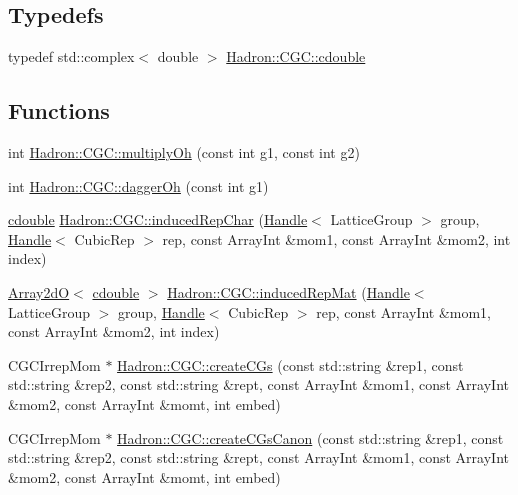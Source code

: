 \subsection*{Typedefs}
\begin{DoxyCompactItemize}
\item 
typedef std\+::complex$<$ double $>$ \mbox{\hyperlink{namespaceHadron_1_1CGC_a52d2b70e6792726fb525eab94daae53b}{Hadron\+::\+C\+G\+C\+::cdouble}}
\end{DoxyCompactItemize}
\subsection*{Functions}
\begin{DoxyCompactItemize}
\item 
int \mbox{\hyperlink{namespaceHadron_1_1CGC_a16432200edf54430116d5593f2f755d6}{Hadron\+::\+C\+G\+C\+::multiply\+Oh}} (const int g1, const int g2)
\item 
int \mbox{\hyperlink{namespaceHadron_1_1CGC_a90d3161b56ca289f2c3f62fa91923dac}{Hadron\+::\+C\+G\+C\+::dagger\+Oh}} (const int g1)
\item 
\mbox{\hyperlink{adat-devel_2main_2irreputils_2cgs__table_8cc_a5f9966666d076841002cd443622b7ccd}{cdouble}} \mbox{\hyperlink{namespaceHadron_1_1CGC_a6508b0e362ceb9df82bdd26575736fc6}{Hadron\+::\+C\+G\+C\+::induced\+Rep\+Char}} (\mbox{\hyperlink{classADAT_1_1Handle}{Handle}}$<$ Lattice\+Group $>$ group, \mbox{\hyperlink{classADAT_1_1Handle}{Handle}}$<$ Cubic\+Rep $>$ rep, const Array\+Int \&mom1, const Array\+Int \&mom2, int index)
\item 
\mbox{\hyperlink{classADAT_1_1Array2dO}{Array2dO}}$<$ \mbox{\hyperlink{adat-devel_2main_2irreputils_2cgs__table_8cc_a5f9966666d076841002cd443622b7ccd}{cdouble}} $>$ \mbox{\hyperlink{namespaceHadron_1_1CGC_aa7e28e013e98896d3053e95ce419f31e}{Hadron\+::\+C\+G\+C\+::induced\+Rep\+Mat}} (\mbox{\hyperlink{classADAT_1_1Handle}{Handle}}$<$ Lattice\+Group $>$ group, \mbox{\hyperlink{classADAT_1_1Handle}{Handle}}$<$ Cubic\+Rep $>$ rep, const Array\+Int \&mom1, const Array\+Int \&mom2, int index)
\item 
C\+G\+C\+Irrep\+Mom $\ast$ \mbox{\hyperlink{namespaceHadron_1_1CGC_a3a95d08c25d8f09a43db0baca8c13e6f}{Hadron\+::\+C\+G\+C\+::create\+C\+Gs}} (const std\+::string \&rep1, const std\+::string \&rep2, const std\+::string \&rept, const Array\+Int \&mom1, const Array\+Int \&mom2, const Array\+Int \&momt, int embed)
\item 
C\+G\+C\+Irrep\+Mom $\ast$ \mbox{\hyperlink{namespaceHadron_1_1CGC_a416e4eef9b4975ce970e2e0ff04a09e6}{Hadron\+::\+C\+G\+C\+::create\+C\+Gs\+Canon}} (const std\+::string \&rep1, const std\+::string \&rep2, const std\+::string \&rept, const Array\+Int \&mom1, const Array\+Int \&mom2, const Array\+Int \&momt, int embed)

\end{DoxyCompactItemize}
